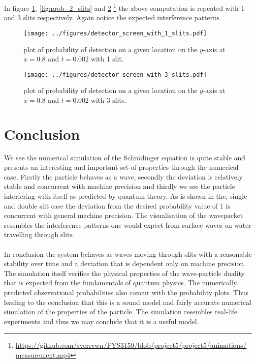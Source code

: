 \documentclass[english,notitlepage,reprint,nofootinbib]{revtex4-1}  %
\begin{document}
	In figure \ref{fig:prob_1_slits}, \ref{fig:prob_2_slits} and \ref{fig:prob_3_slits} \footnote{\url{https://github.com/sverrewn/FYS3150/blob/project5/project5/animations/measurement.mp4}} the above computation is repeated with 1 and 3 slits respectively. Again notice the expected interference patterns.
	\begin{figure}[H]
		\centering
		\texttt{[image: ../figures/detector\_screen\_with\_1\_slits.pdf]} %
		\caption{plot of probability of detection on a given location on the $y$-axis at $x=0.8$ and $t=0.002$ with 1 slit.}
		\label{fig:prob_1_slits}
	\end{figure}
	
	\begin{figure}[H]
		\centering
		\texttt{[image: ../figures/detector\_screen\_with\_3\_slits.pdf]} %
		\caption{plot of probability of detection on a given location on the $y$-axis at $x=0.8$ and $t=0.002$ with 3 slits.}
		\label{fig:prob_3_slits}
	\end{figure}
	
	\section{Conclusion}\label{sec:conclusion}
	We see the numerical simulation of the Schrödinger equation is quite stable and presents an interesting and important set of properties through the numerical case. Firstly the particle behaves as a wave, secondly the deviation is relatively stable and concurrent with machine precision and thirdly we see the particle interfering with itself as predicted by quantum theory. As is shown in the, single and double slit case the deviation from the desired probability value of 1 is concurrent with general machine precision. The visualisation of the wavepacket resembles the interference patterns one would expect from surface waves on water travelling through slits.
	\\
	\\
	
	In conclusion the system behaves as waves moving through slits with a reasonable stability over time and a deviation that is dependent only on machine precision. The simulation itself verifies the physical properties of the wave-particle duality that is expected from the fundamentals of quantum physics. The numerically predicted observational probabilities also concur with the probability plots. Thus leading to the conclusion that this is a sound model and fairly accurate numerical simulation of the properties of the particle. The simulation resembles real-life experiments and thus we may conclude that it is a useful model. 
	
\end{document}
